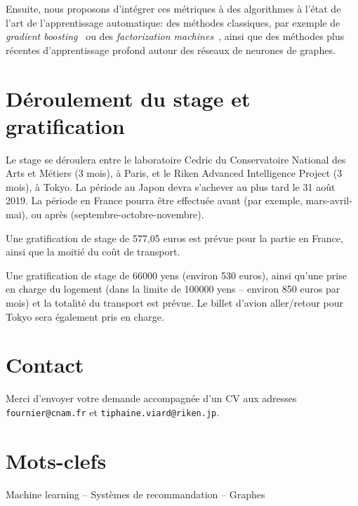 \documentclass[a4paper, 12pt]{article}
\begin{document}
Ensuite, nous proposons d'intégrer ces métriques à des algorithmes à l'état de l'art de l'apprentissage automatique: des méthodes classiques, par exemple de {\em gradient boosting}~\cite{friedman2001greedy} ou des {\em factorization machines}~\cite{rendle2010factorization}, ainsi que des méthodes plus récentes d'apprentissage profond autour des réseaux de neurones de graphes.


\section*{Déroulement du stage et gratification}

Le stage se déroulera entre le laboratoire Cedric du Conservatoire National des Arts et Métiers (3 mois), à Paris, et le Riken Advanced Intelligence Project (3 mois), à Tokyo. La période au Japon devra s'achever au plus tard le 31 août 2019. La période en France pourra être effectuée avant (par exemple, mars-avril-mai), ou après (septembre-octobre-novembre).

Une gratification de stage de 577,05 euros est prévue pour la partie en France, ainsi que la moitié du coût de transport.

Une gratification de stage de 66000 yens (environ 530 euros), ainsi qu'une prise en charge du logement (dans la limite de 100000 yens -- environ 850 euros par mois) et la totalité du transport est prévue. Le billet d'avion aller/retour pour Tokyo sera également pris en charge.

\section*{Contact}

Merci d'envoyer votre demande accompagnée d'un CV aux adresses \texttt{fournier@cnam.fr} et \texttt{tiphaine.viard@riken.jp}. 

\section*{Mots-clefs}

Machine learning -- Systèmes de recommandation -- Graphes

\vfill



\vfill
\end{document}
